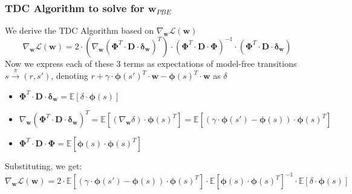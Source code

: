 \documentclass[handout]{beamer}
\newcommand{\bphi}{\bm{\Phi}}
\newcommand{\bd}{\bm{D}}
\newcommand{\bw}{\bm{w}}
\newcommand{\bdel}{\bm{\delta_w}}
\begin{document}
\begin{frame}
\frametitle{TDC Algorithm to solve for $\bm{w}_{PBE}$}
\pause
We derive the TDC Algorithm based on $\nabla_{\bw} \mathcal{L}({\bw})$
$$\nabla_{\bw} \mathcal{L}({\bw}) = 2 \cdot (\nabla_{\bw} (\bphi^T \cdot \bd \cdot \bdel)^T) \cdot (\bphi^T \cdot \bd \cdot \bphi)^{-1} \cdot (\bphi^T \cdot \bd \cdot \bdel)$$
\pause
Now we express each of these 3 terms as expectations of model-free transitions $s \stackrel{\pi}\longrightarrow (r,s')$, denoting $r + \gamma \cdot \bm{\phi}(s')^T \cdot \bw - \bm{\phi}(s)^T \cdot \bw$ as $\delta$
\pause
\begin{itemize}[<+->]
\item $\bphi^T \cdot \bd \cdot \bdel = \mathbb{E}[\delta \cdot \bm{\phi}(s)]$
\item $\nabla_{\bw} (\bphi^T \cdot \bd \cdot \bdel)^T = \mathbb{E}[(\nabla_{\bw} \delta) \cdot \bm{\phi}(s)^T] = \mathbb{E}[(\gamma \cdot \bm{\phi}(s') - \bm{\phi}(s)) \cdot \bm{\phi}(s)^T]$
\item $\bphi^T \cdot \bd \cdot \bphi = \mathbb{E}[\bm{\phi}(s) \cdot \bm{\phi}(s)^T]$
\end{itemize}
\pause
Substituting, we get:
$$\nabla_{\bw} \mathcal{L}({\bw}) = 2 \cdot  \mathbb{E}[(\gamma \cdot \bm{\phi}(s') - \bm{\phi}(s)) \cdot \bm{\phi}(s)^T] \cdot \mathbb{E}[\bm{\phi}(s) \cdot \bm{\phi}(s)^T]^{-1} \cdot \mathbb{E}[\delta \cdot \bm{\phi}(s)]$$
\end{frame}
\end{document}
